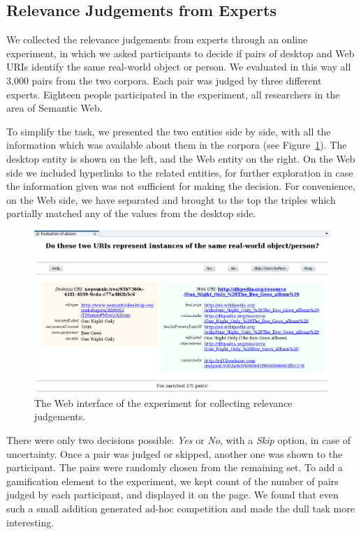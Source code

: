 \subsection{Relevance Judgements from Experts}

We collected the relevance judgements from experts through an online experiment, in which we asked participants to decide if pairs of desktop and Web URIs identify the same real-world object or person. We evaluated in this way all 3,000 pairs from the two corpora. Each pair was judged by three different experts. Eighteen people participated in the experiment, all researchers in the area of Semantic Web. 

To simplify the task, we presented the two entities side by side, with all the information which was available about them in the corpora (see Figure~\ref{fig:onlineexperiment}). The desktop entity is shown on the left, and the Web entity on the right. On the Web side we included hyperlinks to the related entities, for further exploration in case the information given was not sufficient for making the decision. For convenience, on the Web side, we have separated and brought to the top the triples which partially matched any of the values from the desktop side. 

\begin{figure}[htb]
 \includegraphics[width=\linewidth]{chapters/core/img/eval_album.png}
\caption{The Web interface of the experiment for collecting relevance judgements.}
\label{fig:onlineexperiment}
\end{figure} 

There were only two decisions possible: \emph{Yes} or \emph{No}, with a \emph{Skip} option, in case of uncertainty. Once a pair was judged or skipped, another one was shown to the participant. The pairs were randomly chosen from the remaining set. To add a gamification element to the experiment, we kept count of the number of pairs judged by each participant, and displayed it on the page. We found that even such a small addition generated ad-hoc competition and made the dull task more interesting.

